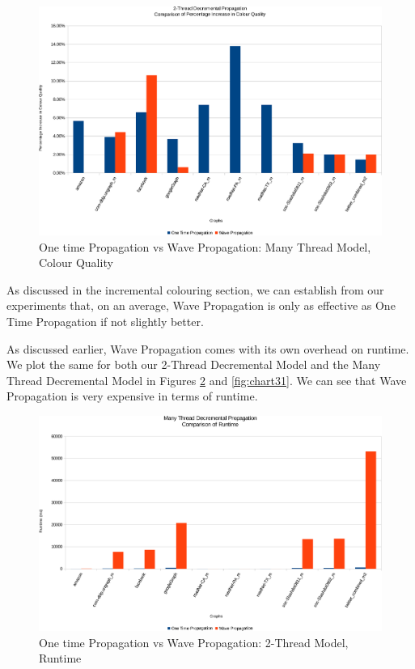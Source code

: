 \documentclass[MTech]{iitmdiss}
\begin{document}
\begin{figure}[h]
    \centering
    \includegraphics[width=\textwidth,keepaspectratio=true]{chartNewest36.pdf}
    \caption{
        One time Propagation vs Wave Propagation: Many Thread Model, Colour Quality
    }
    \label{fig:chart29}
\end{figure}
 
As discussed in the incremental colouring section, we can establish from our experiments that, on an average, Wave Propagation is only as effective as One Time Propagation if not slightly better. 

As discussed earlier, Wave Propagation comes with its own overhead on runtime. We plot the same for both our 2-Thread Decremental Model and the Many Thread Decremental Model in Figures \ref{fig:chart30} and \ref{fig:chart31}. We can see that Wave Propagation is very expensive in terms of runtime.

\begin{figure}[h]
    \centering
    \includegraphics[width=\textwidth,keepaspectratio=true]{chartNewest31.pdf}
    \caption{
        One time Propagation vs Wave Propagation: 2-Thread Model, Runtime
    }
    \label{fig:chart30}
\end{figure}
\end{document}
